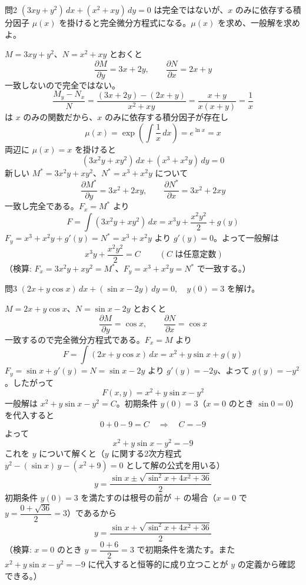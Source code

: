 \documentclass[a4paper,11pt]{article}
\begin{document}
\clearpage
\begin{mondaiboxS}{問2}
$(3xy + y^{2})\,dx + (x^{2} + xy)\,dy = 0$ は完全ではないが、$x$ のみに依存する積分因子 $\mu(x)$ を掛けると完全微分方程式になる。$\mu(x)$ を求め、一般解を求めよ。
\end{mondaiboxS}
\kaitou
$M = 3xy + y^{2}$、$N = x^{2} + xy$ とおくと
\[
\frac{\partial M}{\partial y} = 3x + 2y, \qquad \frac{\partial N}{\partial x} = 2x + y
\]
一致しないので完全ではない。
\[
\frac{M_y - N_x}{N} = \frac{(3x+2y)-(2x+y)}{x^{2}+xy} = \frac{x+y}{x(x+y)} = \frac{1}{x}
\]
は $x$ のみの関数だから、$x$ のみに依存する積分因子が存在し
\[
\mu(x) = \exp\left(\int \frac{1}{x}\,dx\right) = e^{\ln x} = x
\]
両辺に $\mu(x) = x$ を掛けると
\[
(3x^{2}y + xy^{2})\,dx + (x^{3} + x^{2}y)\,dy = 0
\]
新しい $M^{*} = 3x^{2}y + xy^{2}$、$N^{*} = x^{3} + x^{2}y$ について
\[
\frac{\partial M^{*}}{\partial y} = 3x^{2} + 2xy, \qquad \frac{\partial N^{*}}{\partial x} = 3x^{2} + 2xy
\]
一致し完全である。$F_x = M^{*}$ より
\[
F = \int (3x^{2}y + xy^{2})\,dx = x^{3}y + \frac{x^{2}y^{2}}{2} + g(y)
\]
$F_y = x^{3} + x^{2}y + g'(y) = N^{*} = x^{3} + x^{2}y$ より $g'(y) = 0$。よって一般解は
\[
\boxed{\; x^{3}y + \frac{x^{2}y^{2}}{2} = C \;}
\qquad (C \text{ は任意定数})
\]
（検算: $F_x = 3x^{2}y + xy^{2} = M^{*}$、$F_y = x^{3} + x^{2}y = N^{*}$ で一致する。）

\clearpage
\begin{mondaiboxS}{問3}
$(2x + y\cos x)\,dx + (\sin x - 2y)\,dy = 0, \quad y(0) = 3$ を解け。
\end{mondaiboxS}
\kaitou
$M = 2x + y\cos x$、$N = \sin x - 2y$ とおくと
\[
\frac{\partial M}{\partial y} = \cos x, \qquad \frac{\partial N}{\partial x} = \cos x
\]
一致するので完全微分方程式である。$F_x = M$ より
\[
F = \int (2x + y\cos x)\,dx = x^{2} + y\sin x + g(y)
\]
$F_y = \sin x + g'(y) = N = \sin x - 2y$ より $g'(y) = -2y$、よって $g(y) = -y^{2}$。したがって
\[
F(x,y) = x^{2} + y\sin x - y^{2}
\]
一般解は $x^{2} + y\sin x - y^{2} = C$。初期条件 $y(0) = 3$（$x=0$ のとき $\sin 0 = 0$）を代入すると
\[
0 + 0 - 9 = C \quad\Longrightarrow\quad C = -9
\]
よって
\[
x^{2} + y\sin x - y^{2} = -9
\]
これを $y$ について解くと（$y$ に関する2次方程式 $y^{2} - (\sin x)\,y - (x^{2}+9) = 0$ として解の公式を用いる）
\[
y = \frac{\sin x \pm \sqrt{\sin^{2}x + 4x^{2} + 36}}{2}
\]
初期条件 $y(0) = 3$ を満たすのは根号の前が $+$ の場合（$x=0$ で $y = \dfrac{0 + \sqrt{36}}{2} = 3$）であるから
\[
\boxed{\; y = \frac{\sin x + \sqrt{\sin^{2}x + 4x^{2} + 36}}{2} \;}
\]
（検算: $x=0$ のとき $y = \dfrac{0+6}{2} = 3$ で初期条件を満たす。また $x^{2} + y\sin x - y^{2} = -9$ に代入すると恒等的に成り立つことが $y$ の定義から確認できる。）
\end{document}
